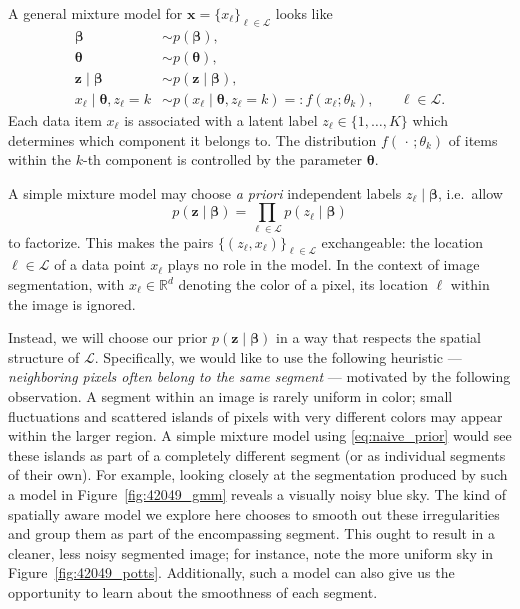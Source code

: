 \documentclass[12pt]{article}
\newcommand{\R}{\mathbb{R}}
\newcommand{\LL}{\mathcal{L}}
\begin{document}
A general mixture model for $\bm{x} = \{x_\ell\}_{\ell \in \LL}$ looks like
\begin{equation}
\label{eq:general_mixture}
\begin{aligned}
    \bm{\beta}
        &\sim p(\bm{\beta}), \\
    \bm{\theta}
        &\sim p(\bm{\theta}), \\
    \bm{z} \mid \bm\beta
        &\sim p(\bm{z} \mid \bm\beta), \\
    x_\ell \mid \bm\theta, z_\ell = k
        &\sim p(x_\ell \mid \bm\theta, z_\ell = k) =: f(x_\ell; \theta_k),
            &\quad\ell \in \LL.
\end{aligned}
\end{equation}
Each data item $x_\ell$ is associated with a latent label $z_\ell \in \{1,
\dots, K\}$ which determines which component it belongs to.
The distribution $f(\,\cdot\,; \theta_k)$ of items within the $k$-th component
is controlled by the parameter $\bm\theta$.

A simple mixture model may choose \emph{a priori} independent labels $z_\ell
\mid \bm\beta$, i.e.\ allow \begin{equation}
\label{eq:naive_prior}
    p(\bm{z} \mid \bm\beta) = \prod_{\ell \in \LL} p(z_\ell \mid \bm\beta)
\end{equation}
to factorize.
This makes the pairs $\{(z_\ell, x_\ell)\}_{\ell \in \LL}$
exchangeable: the location $\ell \in \LL$ of a data point $x_\ell$ plays no
role in the model.
In the context of image segmentation, with $x_\ell \in \R^d$ denoting the color
of a pixel, its location $\ell$ within the image is ignored.

Instead, we will choose our prior $p(\bm{z}\mid\bm\beta)$ in a way that
respects the spatial structure of $\LL$.
Specifically, we would like to use the following heuristic ---
\emph{neighboring pixels often belong to the same segment} --- motivated by the
following observation.
A segment within an image is rarely uniform in color; small fluctuations and
scattered islands of pixels with very different colors may appear within the
larger region.
A simple mixture model using \eqref{eq:naive_prior} would see these islands as
part of a completely different segment (or as individual segments of their
own).
For example, looking closely at the segmentation produced by such a model in
Figure~\ref{fig:42049_gmm} reveals a visually noisy blue sky.
The kind of spatially aware model we explore here chooses to smooth out these
irregularities and group them as part of the encompassing segment.
This ought to result in a cleaner, less noisy segmented image; for instance,
note the more uniform sky in Figure~\ref{fig:42049_potts}.
Additionally, such a model can also give us the opportunity to learn about the
smoothness of each segment.
\end{document}
